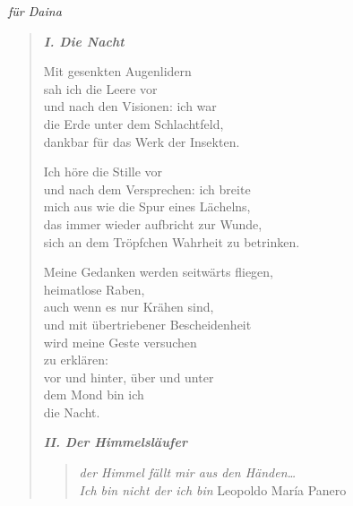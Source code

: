 
\cleartoverso

\label{yucatan}

\hspace*{2em}\emph{für Daina}

\begin{verse}

{\bfseries\itshape I. Die Nacht}

Mit gesenkten Augenlidern\\
sah ich die Leere vor\\
und nach den Visionen: ich war\\
die Erde unter dem Schlachtfeld,\\
dankbar für das Werk der Insekten.

Ich höre die Stille vor\\
und nach dem Versprechen: ich breite\\
mich aus wie die Spur eines Lächelns,\\
das immer wieder aufbricht zur Wunde,\\
sich an dem Tröpfchen Wahrheit zu betrinken.

Meine Gedanken werden seitwärts fliegen,\\
heimatlose Raben,\\
auch wenn es nur Krähen sind,\\
und mit übertriebener Bescheidenheit\\
wird meine Geste versuchen\\
zu erklären:\\
vor und hinter, über und unter\\
dem Mond bin ich\\
die Nacht.

{\bfseries\itshape II. Der Himmelsläufer}

\begin{quote}
{\itshape der Himmel fällt mir aus den Händen\ldots\\
Ich bin nicht der ich bin}
\hspace{2em} Leopoldo María Panero
\end{quote}


\end{verse}
